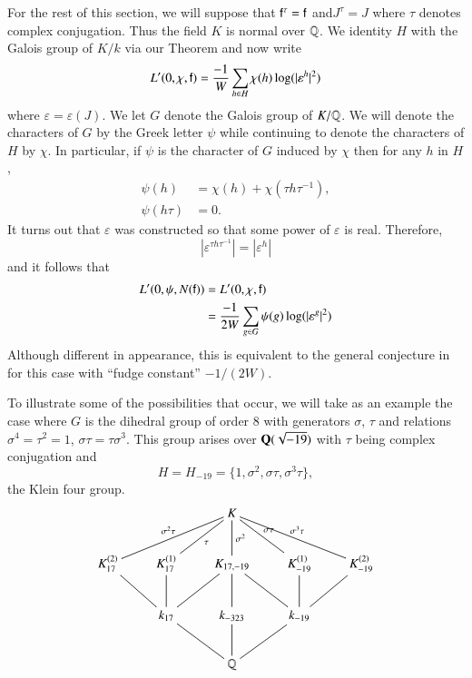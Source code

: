 For the rest of this section, we will suppose that $\mathsf{f}^\tau = \mathsf{f}$ and$J^\tau = J$ where $\tau$ denotes complex conjugation. Thus the field $K$ is normal over $\mathbb{Q}$. We identity $H$ with the Galois group of $K/k$ via our Theorem and now write\pageoriginale 
$$
L' (0, \chi, \mathsf{f}) = \frac{-1}{W} \sum\limits_{h \in H} \chi (h) \log (|\varepsilon^h|^2)
$$
where $\varepsilon = \varepsilon (J)$. We let $G$ denote the Galois group of $K/\mathbb{Q}$. We will denote the characters of $G$ by the Greek letter $\psi$ while continuing to denote the characters of $H$ by $\chi$. In particular, if $\psi$ is the character of $G$ induced by $\chi$ then for any $h$ in $H$,
\begin{align*}
\psi (h) & = \chi (h) + \chi (\tau h \tau^{-1}),\\
\psi (h\tau) & = 0.
\end{align*}
It turns out that $\varepsilon$ was constructed so that some power of $\varepsilon$ is real. Therefore,
$$
|\varepsilon^{\tau h \tau^{-1}}| = |\varepsilon^h|
$$
and it follows that 
\begin{align*}
L'(0,\psi, N (\mathsf{f})) & = L'(0, \chi, \mathsf{f})\\
& = \frac{-1}{2W} \sum\limits_{g \in G} \psi (g) \log (|\varepsilon^g|^2)
\end{align*}
Although different in appearance, this is equivalent to the general conjecture in \cite[II]{art9-6} for this case with ``fudge constant'' $-1/(2W)$.

To illustrate some of the possibilities that occur, we will take as an example the case where $G$ is the dihedral group of order 8 with generators $\sigma$, $\tau$ and relations $\sigma^4 = \tau^2 = 1$, $\sigma \tau = \tau \sigma^3$. This group arises over $\mathbf{Q} (\sqrt{-19})$ with $\tau$ being complex conjugation and 
$$
H = H_{-19} = \{1, \sigma^2, \sigma \tau, \sigma^3 \tau\},
$$
the Klein four group. 
$$
\xymatrix{
& & K \ar@{-}[d]^-{\sigma^2} \ar@{-}[dll]_-{\sigma^2 \tau} \ar@{-}[dl]^-{\tau} \ar@{-}[dr]^-{\sigma \tau} \ar@{-}[drr]^-{\sigma^3 \tau} & & \\
K^{(2)}_{17} \ar@{-}[dr]& K^{(1)}_{17} \ar@{-}[d] & K_{17, -19} \ar@{-}[d] \ar@{-}[dr]\ar@{-}[dl] & K^{(1)}_{-19} \ar@{-}[d]& K^{(2)}_{-19} \ar@{-}[dl]\\
& k_{17}  \ar@{-}[dr]& k_{-323}\ar@{-}[d] & k_{-19} \ar@{-}[dl]& \\
& & \bbQ& & 
}
$$

